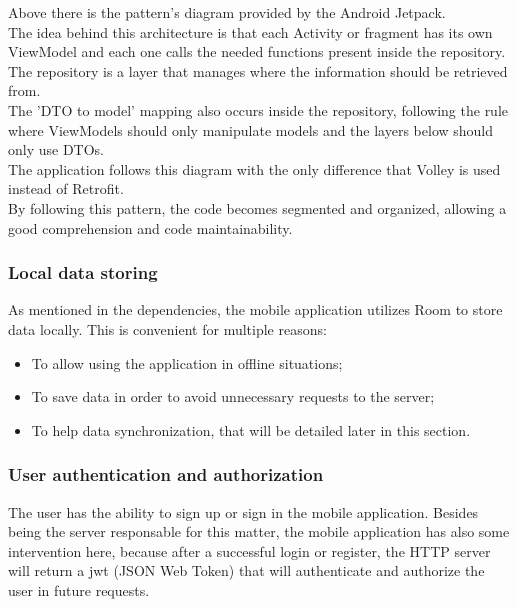 Above there is the pattern's diagram provided by the Android Jetpack.\\

The idea behind this architecture is that each Activity or fragment has its own ViewModel and each one calls the needed functions present inside the repository.
The repository is a layer that manages where the information should be retrieved from.\\

The 'DTO to model' mapping also occurs inside the repository, following the rule where ViewModels should only manipulate models and the layers below should only use DTOs.\\

The application follows this diagram with the only difference that Volley is used instead of Retrofit.\\

By following this pattern, the code becomes segmented and organized,
allowing a good comprehension and code maintainability.\\

\subsubsection{Local data storing}

As mentioned in the dependencies, the mobile application utilizes Room to store data locally. This is convenient
for multiple reasons: 
\begin{itemize}
    \item To allow using the application in offline situations;
    \item To save data in order to avoid unnecessary requests to the server;
    \item To help data synchronization, that will be detailed later in this section.
\end{itemize}

\subsubsection{User authentication and authorization}

The user has the ability to sign up or sign in the mobile application. Besides being the server responsable for this matter, the mobile application has also some intervention
here, because after a successful login or register, the HTTP server will return a jwt (JSON Web Token) that will authenticate and authorize the user in future requests.\\

